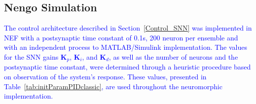 \documentclass[conference]{IEEEtran}
\begin{document}


\subsection{Nengo Simulation}

\textcolor{blue}{The control architecture described in Section~\ref{Control_SNN} was implemented in NEF with a postsynaptic time constant of 0.1s, 200 neuron per ensemble and with an independent process to MATLAB/Simulink implementation. The values for the SNN gains $\textbf{K}_p$, $\textbf{K}_i$, and $\textbf{K}_d$, as well as the number of neurons and the postsynaptic time constant, were determined through a heuristic procedure based on observation of the system's response. These values, presented in Table~\ref{tab:initParamPIDclassic}, are used throughout the neuromorphic implementation.} %
\end{document}
